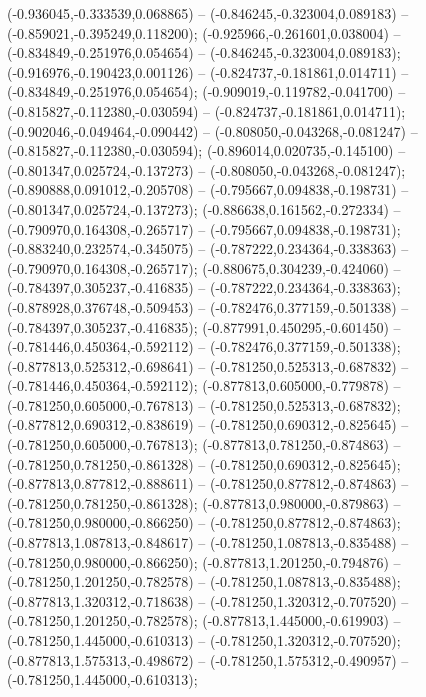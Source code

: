  (-0.936045,-0.333539,0.068865) -- (-0.846245,-0.323004,0.089183) -- (-0.859021,-0.395249,0.118200);
 (-0.925966,-0.261601,0.038004) -- (-0.834849,-0.251976,0.054654) -- (-0.846245,-0.323004,0.089183);
 (-0.916976,-0.190423,0.001126) -- (-0.824737,-0.181861,0.014711) -- (-0.834849,-0.251976,0.054654);
 (-0.909019,-0.119782,-0.041700) -- (-0.815827,-0.112380,-0.030594) -- (-0.824737,-0.181861,0.014711);
 (-0.902046,-0.049464,-0.090442) -- (-0.808050,-0.043268,-0.081247) -- (-0.815827,-0.112380,-0.030594);
 (-0.896014,0.020735,-0.145100) -- (-0.801347,0.025724,-0.137273) -- (-0.808050,-0.043268,-0.081247);
 (-0.890888,0.091012,-0.205708) -- (-0.795667,0.094838,-0.198731) -- (-0.801347,0.025724,-0.137273);
 (-0.886638,0.161562,-0.272334) -- (-0.790970,0.164308,-0.265717) -- (-0.795667,0.094838,-0.198731);
 (-0.883240,0.232574,-0.345075) -- (-0.787222,0.234364,-0.338363) -- (-0.790970,0.164308,-0.265717);
 (-0.880675,0.304239,-0.424060) -- (-0.784397,0.305237,-0.416835) -- (-0.787222,0.234364,-0.338363);
 (-0.878928,0.376748,-0.509453) -- (-0.782476,0.377159,-0.501338) -- (-0.784397,0.305237,-0.416835);
 (-0.877991,0.450295,-0.601450) -- (-0.781446,0.450364,-0.592112) -- (-0.782476,0.377159,-0.501338);
 (-0.877813,0.525312,-0.698641) -- (-0.781250,0.525313,-0.687832) -- (-0.781446,0.450364,-0.592112);
 (-0.877813,0.605000,-0.779878) -- (-0.781250,0.605000,-0.767813) -- (-0.781250,0.525313,-0.687832);
 (-0.877812,0.690312,-0.838619) -- (-0.781250,0.690312,-0.825645) -- (-0.781250,0.605000,-0.767813);
 (-0.877813,0.781250,-0.874863) -- (-0.781250,0.781250,-0.861328) -- (-0.781250,0.690312,-0.825645);
 (-0.877813,0.877812,-0.888611) -- (-0.781250,0.877812,-0.874863) -- (-0.781250,0.781250,-0.861328);
 (-0.877813,0.980000,-0.879863) -- (-0.781250,0.980000,-0.866250) -- (-0.781250,0.877812,-0.874863);
 (-0.877813,1.087813,-0.848617) -- (-0.781250,1.087813,-0.835488) -- (-0.781250,0.980000,-0.866250);
 (-0.877813,1.201250,-0.794876) -- (-0.781250,1.201250,-0.782578) -- (-0.781250,1.087813,-0.835488);
 (-0.877813,1.320312,-0.718638) -- (-0.781250,1.320312,-0.707520) -- (-0.781250,1.201250,-0.782578);
 (-0.877813,1.445000,-0.619903) -- (-0.781250,1.445000,-0.610313) -- (-0.781250,1.320312,-0.707520);
 (-0.877813,1.575313,-0.498672) -- (-0.781250,1.575312,-0.490957) -- (-0.781250,1.445000,-0.610313);
